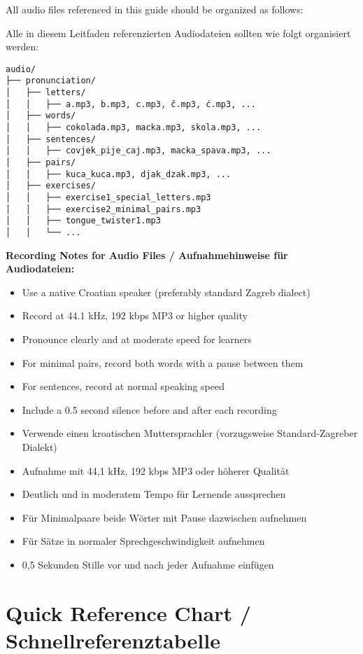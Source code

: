 All audio files referenced in this guide should be organized as follows:

Alle in diesem Leitfaden referenzierten Audiodateien sollten wie folgt organisiert werden:

\begin{verbatim}
audio/
├── pronunciation/
│   ├── letters/
│   │   ├── a.mp3, b.mp3, c.mp3, č.mp3, ć.mp3, ...
│   ├── words/
│   │   ├── cokolada.mp3, macka.mp3, skola.mp3, ...
│   ├── sentences/
│   │   ├── covjek_pije_caj.mp3, macka_spava.mp3, ...
│   ├── pairs/
│   │   ├── kuca_kuca.mp3, djak_dzak.mp3, ...
│   ├── exercises/
│   │   ├── exercise1_special_letters.mp3
│   │   ├── exercise2_minimal_pairs.mp3
│   │   ├── tongue_twister1.mp3
│   │   └── ...
\end{verbatim}

\textbf{Recording Notes for Audio Files / Aufnahmehinweise für Audiodateien:}
\begin{itemize}
    \item Use a native Croatian speaker (preferably standard Zagreb dialect)
    \item Record at 44.1 kHz, 192 kbps MP3 or higher quality
    \item Pronounce clearly and at moderate speed for learners
    \item For minimal pairs, record both words with a pause between them
    \item For sentences, record at normal speaking speed
    \item Include a 0.5 second silence before and after each recording
    \item Verwende einen kroatischen Muttersprachler (vorzugsweise Standard-Zagreber Dialekt)
    \item Aufnahme mit 44,1 kHz, 192 kbps MP3 oder höherer Qualität
    \item Deutlich und in moderatem Tempo für Lernende aussprechen
    \item Für Minimalpaare beide Wörter mit Pause dazwischen aufnehmen
    \item Für Sätze in normaler Sprechgeschwindigkeit aufnehmen
    \item 0,5 Sekunden Stille vor und nach jeder Aufnahme einfügen
\end{itemize}

\section{Quick Reference Chart / Schnellreferenztabelle}

